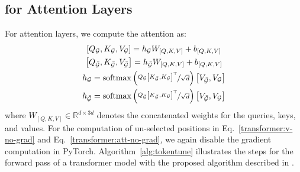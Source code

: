 

\subsection{\method for Attention Layers}
\label{method:att}

For attention layers, we compute the attention as:
\begin{gather}
\left[Q_{\mathcal{G}}, K_{\mathcal{G}}, V_{\mathcal{G}}\right] = h_{\mathcal{G}}W_{\left[Q,K,V\right]}  + b_{\left[Q,K,V\right]}
\label{transformer:v}\\
\left[Q_{\bar{\mathcal{G}}}, K_{\bar{\mathcal{G}}}, V_{\bar{\mathcal{G}}}\right] = h_{\bar{\mathcal{G}}} W_{\left[Q,K,V\right]}  + b_{\left[Q,K,V\right]}
\label{transformer:v-no-grad}\\
h_{\mathcal{G}} = \mathrm{softmax} \left( \nicefrac{Q_{\mathcal{G}} \left[K_{\bar{\mathcal{G}}}, K_{\mathcal{G}}\right]^{\top}}{\sqrt{d}}  \right) \left[V_{\bar{\mathcal{G}}}, V_{\mathcal{G}}\right] \label{transformer:att-grad}\\
h_{\bar{\mathcal{G}}} = \mathrm{softmax} \left( \nicefrac{Q_{\bar{\mathcal{G}}} \left[K_{\bar{\mathcal{G}}}, K_{\mathcal{G}}\right]^{\top}}{\sqrt{d}}  \right) \left[V_{\bar{\mathcal{G}}}, V_{\mathcal{G}}\right] \label{transformer:att-no-grad}
\end{gather}
where  $W_{\left[Q,K,V\right]} \in \mathbb{R}^{d\times 3d}$ denotes the concatenated weights for the queries, keys, and values.
For the computation of un-selected positions in Eq.~\ref{transformer:v-no-grad} and Eq.~\ref{transformer:att-no-grad}, we again disable the gradient computation in PyTorch.
Algorithm~\ref{alg:tokentune} illustrates the steps for the forward pass of a transformer model with the proposed \method algorithm described in .


